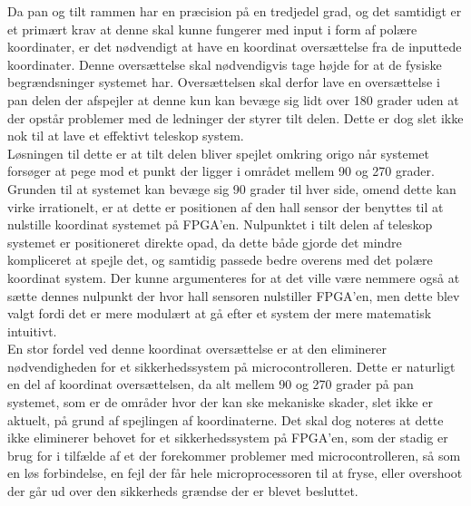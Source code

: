 Da pan og tilt rammen har en præcision på en tredjedel grad, og det samtidigt er et primært krav at denne skal kunne fungerer med input i form af polære koordinater, er det nødvendigt at have en koordinat oversættelse fra de inputtede koordinater. Denne oversættelse skal nødvendigvis tage højde for at de fysiske begrændsninger systemet har. Oversættelsen skal derfor lave en oversættelse i pan delen der afspejler at denne kun kan bevæge sig lidt over 180 grader uden at der opstår problemer med de ledninger der styrer tilt delen. Dette er dog slet ikke nok til at lave et effektivt teleskop system.
\\
Løsningen til dette er at tilt delen bliver spejlet omkring origo når systemet forsøger at pege mod et punkt der ligger i området mellem 90 og 270 grader. Grunden til at systemet kan bevæge sig 90 grader til hver side, omend dette kan virke irrationelt, er at dette er positionen af den hall sensor der benyttes til at nulstille koordinat systemet på FPGA'en. Nulpunktet i tilt delen af teleskop systemet er positioneret direkte opad, da dette både gjorde det mindre kompliceret at spejle det, og samtidig passede bedre overens med det polære koordinat system. Der kunne argumenteres for at det ville være nemmere også at sætte dennes nulpunkt der hvor hall sensoren nulstiller FPGA'en, men dette blev valgt fordi det er mere modulært at gå efter et system der mere matematisk intuitivt.
\\
En stor fordel ved denne koordinat oversættelse er at den eliminerer nødvendigheden for et sikkerhedssystem på microcontrolleren. Dette er naturligt en del af koordinat oversættelsen, da alt mellem 90 og 270 grader på pan systemet, som er de områder hvor der kan ske mekaniske skader, slet ikke er aktuelt, på grund af spejlingen af koordinaterne. Det skal dog noteres at dette ikke eliminerer behovet for et sikkerhedssystem på FPGA'en, som der stadig er brug for i tilfælde af et der forekommer problemer med microcontrolleren, så som en løs forbindelse, en fejl der får hele microprocessoren til at fryse, eller overshoot der går ud over den sikkerheds grændse der er blevet besluttet.




















